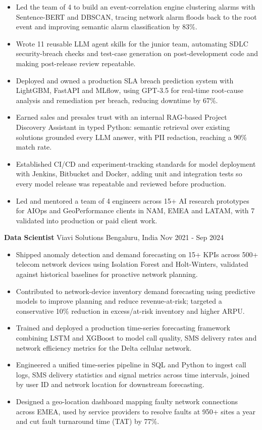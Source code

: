 \documentclass[10pt,a4paper]{article}
\newcommand{\role}[4]{\textbf{#1} \textbar{} #2 \hfill #3 \textbar{} #4\par}
\begin{document}
\begin{itemize}
  \item Led the team of 4 to build an event-correlation engine clustering alarms with Sentence-BERT and DBSCAN, tracing network alarm floods back to the root event and improving semantic alarm classification by 83\%.
  \item Wrote 11 reusable LLM agent skills for the junior team, automating SDLC security-breach checks and test-case generation on post-development code and making post-release review repeatable.
  \item Deployed and owned a production SLA breach prediction system with LightGBM, FastAPI and MLflow, using GPT-3.5 for real-time root-cause analysis and remediation per breach, reducing downtime by 67\%.
  \item Earned sales and presales trust with an internal RAG-based Project Discovery Assistant in typed Python: semantic retrieval over existing solutions grounded every LLM answer, with PII redaction, reaching a 90\% match rate.
  \item Established CI/CD and experiment-tracking standards for model deployment with Jenkins, Bitbucket and Docker, adding unit and integration tests so every model release was repeatable and reviewed before production.
  \item Led and mentored a team of 4 engineers across 15+ AI research prototypes for AIOps and GeoPerformance clients in NAM, EMEA and LATAM, with 7 validated into production or paid client work.
\end{itemize}
\vspace{3pt}
\role{Data Scientist}{Viavi Solutions}{Bengaluru, India}{Nov 2021 - Sep 2024}
\begin{itemize}
  \item Shipped anomaly detection and demand forecasting on 15+ KPIs across 500+ telecom network devices using Isolation Forest and Holt-Winters, validated against historical baselines for proactive network planning.
  \item Contributed to network-device inventory demand forecasting using predictive models to improve planning and reduce revenue-at-risk; targeted a conservative 10\% reduction in excess/at-risk inventory and higher ARPU.
  \item Trained and deployed a production time-series forecasting framework combining LSTM and XGBoost to model call quality, SMS delivery rates and network efficiency metrics for the Delta cellular network.
  \item Engineered a unified time-series pipeline in SQL and Python to ingest call logs, SMS delivery statistics and signal metrics across time intervals, joined by user ID and network location for downstream forecasting.
  \item Designed a geo-location dashboard mapping faulty network connections across EMEA, used by service providers to resolve faults at 950+ sites a year and cut fault turnaround time (TAT) by 77\%.
\end{itemize}
\end{document}
